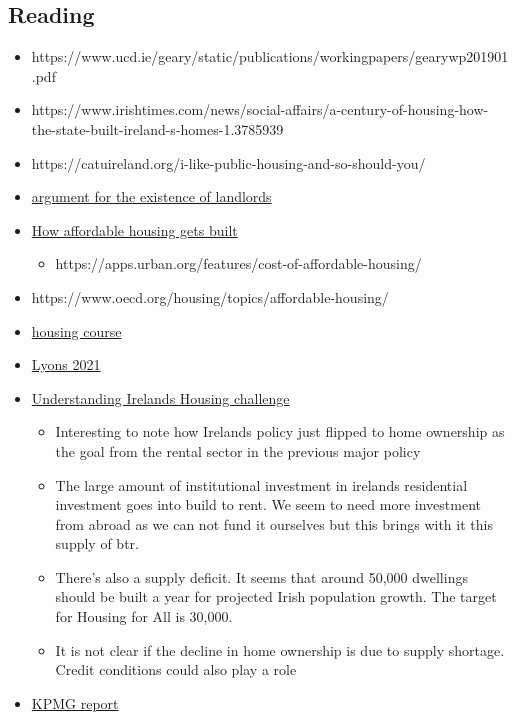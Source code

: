 \documentclass[11pt]{article}
\begin{document}
\hypertarget{reading}{%
\subsection{Reading}\label{reading}}

\begin{itemize}
\tightlist
\item
  https://www.ucd.ie/geary/static/publications/workingpapers/gearywp201901.pdf
\item
  https://www.irishtimes.com/news/social-affairs/a-century-of-housing-how-the-state-built-ireland-s-homes-1.3785939
\item
  https://catuireland.org/i-like-public-housing-and-so-should-you/
\item
  \href{https://mises.org/wire/why-we-need-landlords}{argument for the
  existence of landlords}
\item
  \href{https://www.urban.org/urban-wire/how-affordable-housing-gets-built}{How
  affordable housing gets built}

  \begin{itemize}
  \tightlist
  \item
    https://apps.urban.org/features/cost-of-affordable-housing/
  \end{itemize}
\item
  https://www.oecd.org/housing/topics/affordable-housing/
\item
  \href{./../../vimwiki/Housing\%20Market\%20Course.md}{housing course}
\item
  \href{https://irp.cdn-website.com/4065c16c/files/uploaded/Identify\%20Consulting\%20June\%202021\%20PRS\%20Report\%20for\%20IIP\%20-\%20final.pdf}{Lyons
  2021}
\item
  \href{https://publicpolicy.ie/perspectives/understanding-irelands-housing-challenge-in-the-light-of-housing-for-all/}{Understanding
  Irelands Housing challenge}

  \begin{itemize}
  \tightlist
  \item
    Interesting to note how Irelands policy just flipped to home
    ownership as the goal from the rental sector in the previous major
    policy
  \item
    The large amount of institutional investment in irelands residential
    investment goes into build to rent. We seem to need more investment
    from abroad as we can not fund it ourselves but this brings with it
    this supply of btr.
  \item
    There's also a supply deficit. It seems that around 50,000 dwellings
    should be built a year for projected Irish population growth. The
    target for Housing for All is 30,000.
  \item
    It is not clear if the decline in home ownership is due to supply
    shortage. Credit conditions could also play a role
  \end{itemize}
\item
  \href{https://www.cluid.ie/wp-content/uploads/2021/04/WEB-Cluid-Housing-Towards-a-Sustainable-Rental-Sector-in-Ireland-Understanding-the-Key-Challenges-and-Opportunities.pdf}{KPMG
  report}


\end{itemize}
\end{document}
